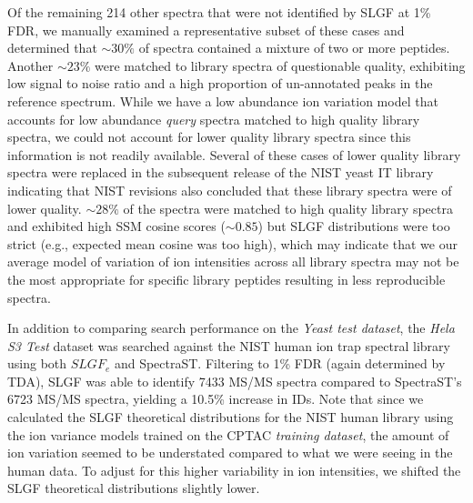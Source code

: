 \documentclass[endnotes,11pt]{article}
\begin{document}
Of the remaining 214 other spectra that were not identified by SLGF at 1\% FDR, we manually examined a representative subset of these cases and determined that $\sim 30\%$ of spectra contained a mixture of two or more peptides. Another $\sim 23\%$ were matched to library spectra of questionable quality, exhibiting low signal to noise ratio and a high proportion of un-annotated peaks in the reference spectrum. While we have a low abundance ion variation model that accounts for low abundance {\em query} spectra matched to high quality library spectra, we could not account for lower quality library spectra since this information is not readily available. Several of these cases of lower quality library spectra were replaced in the subsequent release of the NIST yeast IT library indicating that NIST revisions also concluded that these library spectra were of lower quality. $\sim 28\%$ of the spectra were matched to high quality library spectra and exhibited high SSM cosine scores ($\sim 0.85$) but SLGF distributions were too strict (e.g., expected mean cosine was too high), which may indicate that we our average model of variation of ion intensities across all library spectra may not be the most appropriate for specific library peptides resulting in less reproducible spectra. %

In addition to comparing search performance on the {\em Yeast test dataset}, the {\em Hela S3 Test} dataset was searched against the NIST human ion trap spectral library using both $SLGF_{e}$ and SpectraST. Filtering to 1\% FDR (again determined by TDA), SLGF was able to identify 7433 MS/MS spectra compared to SpectraST's 6723 MS/MS spectra, yielding a 10.5\% increase in IDs. Note that since we calculated the SLGF theoretical distributions for the NIST human library using the ion variance models trained on the CPTAC {\em training dataset}, the amount of ion variation seemed to be understated compared to what we were seeing in the human data. To adjust for this higher variability in ion intensities, we shifted the SLGF theoretical distributions slightly lower. 
\end{document}

